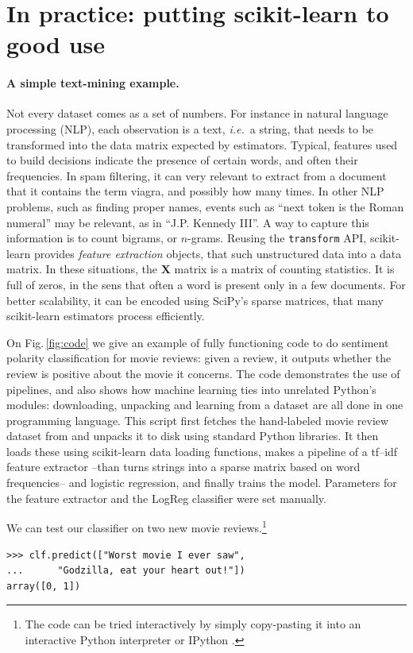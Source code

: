 \documentclass[a4paper]{article}
\begin{document}
\section{In practice: putting scikit-learn to good use}

\paragraph{A simple text-mining example.}
%
Not every dataset comes as a set of numbers. For instance in natural
language processing (NLP), each observation is a text, \emph{i.e.}~a
string, that needs to be transformed into the data matrix expected by
estimators. Typical, features used to build decisions indicate the
presence of certain words, and often their frequencies.
In spam filtering, it can very relevant to extract from a document that
it contains the term \textsf{viagra}, and possibly how many times.
In other NLP problems, such as finding proper names,
events such as ``next token is the Roman numeral'' may be relevant, as in
``J.P. Kennedy III''. A way to capture this information is to count bigrams,
or $n$-grams. Reusing the {\tt transform} API, scikit-learn
provides \emph{feature extraction} objects, that  such
unstructured data into a data matrix. In these situations, the
$\textbf{X}$ matrix is a
matrix of counting statistics. It is full of zeros, in the sens that
often a word is present only in a few documents. For better scalability,
it can be encoded using SciPy's sparse matrices, that many scikit-learn
estimators process efficiently.

On Fig.\,\ref{fig:code} we give an example of fully functioning code to
do sentiment polarity classification for movie reviews: given a review,
it outputs whether the review is positive about the movie it concerns.
The code demonstrates the use of pipelines, and also shows how machine
learning ties into unrelated Python's modules: downloading, unpacking and
learning from a dataset are all done in one programming language.
This script first fetches the hand-labeled movie review dataset from
\cite{pang2004} and unpacks it to disk using standard Python libraries.
It then loads these using scikit-learn data loading functions, makes a
pipeline of a \textsf{tf--idf} feature extractor
\cite{rennie2003tackling} --than turns strings into a sparse matrix based
on word frequencies-- and logistic regression, and finally trains the
model. Parameters for the feature extractor and the LogReg classifier
were set manually.

We can test our classifier on two new movie reviews.\footnote{
  The code can be tried interactively by simply copy-pasting it
  into an interactive Python interpreter or IPython \cite{perez2007ipython}.
}
\begin{lstlisting}
>>> clf.predict(["Worst movie I ever saw",
...      "Godzilla, eat your heart out!"])
array([0, 1])
\end{lstlisting}
\end{document}
